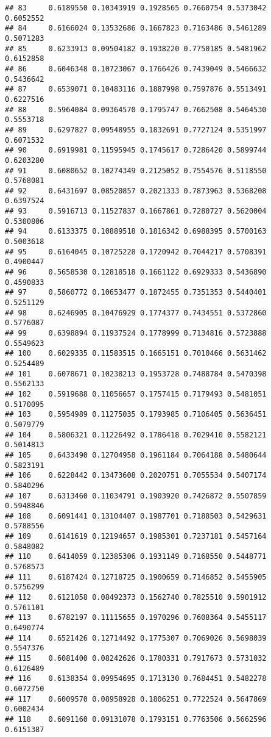 \documentclass[]{article}
\begin{document}
\begin{verbatim}
## 83     0.6189550 0.10343919 0.1928565 0.7660754 0.5373042    0.6052552
## 84     0.6166024 0.13532686 0.1667823 0.7163486 0.5461289    0.5071283
## 85     0.6233913 0.09504182 0.1938220 0.7750185 0.5481962    0.6152858
## 86     0.6046348 0.10723067 0.1766426 0.7439049 0.5466632    0.5436642
## 87     0.6539071 0.10483116 0.1887998 0.7597876 0.5513491    0.6227516
## 88     0.5964084 0.09364570 0.1795747 0.7662508 0.5464530    0.5553718
## 89     0.6297827 0.09548955 0.1832691 0.7727124 0.5351997    0.6071532
## 90     0.6919981 0.11595945 0.1745617 0.7286420 0.5899744    0.6203280
## 91     0.6080652 0.10274349 0.2125052 0.7554576 0.5118550    0.5768081
## 92     0.6431697 0.08520857 0.2021333 0.7873963 0.5368208    0.6397524
## 93     0.5916713 0.11527837 0.1667861 0.7280727 0.5620004    0.5300806
## 94     0.6133375 0.10889518 0.1816342 0.6988395 0.5700163    0.5003618
## 95     0.6164045 0.10725228 0.1720942 0.7044217 0.5708391    0.4900447
## 96     0.5658530 0.12818518 0.1661122 0.6929333 0.5436890    0.4590833
## 97     0.5860772 0.10653477 0.1872455 0.7351353 0.5440401    0.5251129
## 98     0.6246905 0.10476929 0.1774377 0.7434551 0.5372860    0.5776087
## 99     0.6398894 0.11937524 0.1778999 0.7134816 0.5723888    0.5549623
## 100    0.6029335 0.11583515 0.1665151 0.7010466 0.5631462    0.5254489
## 101    0.6078671 0.10238213 0.1953728 0.7488784 0.5470398    0.5562133
## 102    0.5919688 0.11056657 0.1757415 0.7179493 0.5481051    0.5170095
## 103    0.5954989 0.11275035 0.1793985 0.7106405 0.5636451    0.5079779
## 104    0.5806321 0.11226492 0.1786418 0.7029410 0.5582121    0.5014813
## 105    0.6433490 0.12704958 0.1961184 0.7064188 0.5480644    0.5823191
## 106    0.6228442 0.13473608 0.2020751 0.7055534 0.5407174    0.5840296
## 107    0.6313460 0.11034791 0.1903920 0.7426872 0.5507859    0.5948846
## 108    0.6091441 0.13104407 0.1987701 0.7188503 0.5429631    0.5788556
## 109    0.6141619 0.12194657 0.1985301 0.7237181 0.5457164    0.5848082
## 110    0.6414059 0.12385306 0.1931149 0.7168550 0.5448771    0.5768573
## 111    0.6187424 0.12718725 0.1900659 0.7146852 0.5455905    0.5756299
## 112    0.6121058 0.08492373 0.1562740 0.7825510 0.5901912    0.5761101
## 113    0.6782197 0.11115655 0.1970296 0.7608364 0.5455117    0.6490774
## 114    0.6521426 0.12714492 0.1775307 0.7069026 0.5698039    0.5547376
## 115    0.6081400 0.08242626 0.1780331 0.7917673 0.5731032    0.6126489
## 116    0.6138354 0.09954695 0.1713130 0.7684451 0.5482278    0.6072750
## 117    0.6009570 0.08958928 0.1806251 0.7722524 0.5647869    0.6002434
## 118    0.6091160 0.09131078 0.1793151 0.7763506 0.5662596    0.6151387

\end{verbatim}
\end{document}
